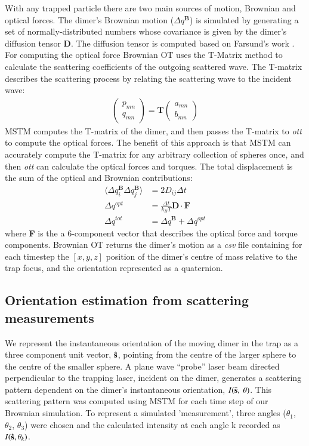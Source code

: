 \documentclass[final, 3p]{elsarticle}
\begin{document}
With any trapped particle there are two main sources of motion,
Brownian and optical forces.  The dimer's Brownian motion
($\Delta q^{\textbf{B}}$) is simulated by generating a set of
normally-distributed numbers whose covariance is given by the dimer's
diffusion tensor $\textbf{D}$.  The diffusion tensor is computed based
on Farsund's work \cite{Farsund1996}. For computing the optical force
Brownian OT uses the T-Matrix method to calculate the scattering
coefficients of the outgoing scattered wave.  The T-matrix describes
the scattering process by relating the scattering wave to the incident
wave:
\begin{align}
	\begin{pmatrix}
		p_{mn} \\
		q_{mn}
	\end{pmatrix}
	= \textbf{T}
	\begin{pmatrix}
		a_{mn} \\
		b_{mn}
	\end{pmatrix}
\end{align}
MSTM computes the T-matrix of the dimer, and then passes the T-matrix
to \textit{ott} to compute the optical forces. The benefit of this
approach is that MSTM can accurately compute the T-matrix for any
arbitrary collection of spheres once, and then \textit{ott} can
calculate the optical forces and torques. The total displacement is
the sum of the optical and Brownian contributions:
\begin{align}
  \langle \Delta q_i^{\textbf{B}} \Delta q_j^{\textbf{B}}\rangle
  &= 2D_{ij} \Delta t
  \\
  \Delta q^{opt} &= \frac{\Delta t}{k_BT}\textbf{D} \cdot \textbf{F}
  \\
\Delta q^{tot} &= \Delta q^{\textbf{B}} + \Delta q^{opt}
\end{align}
where \textbf{F} is the a 6-component vector that describes the
optical force and torque components.  Brownian OT returns the dimer's
motion as a \textit{csv} file containing for each timestep the
$[x,y,z]$ position of the dimer's centre of mass relative to the trap
focus, and the orientation represented as a quaternion.


\subsection{Orientation estimation from scattering measurements}
\label{sec:2.2}

We represent the instantaneous orientation of the moving dimer in the
trap as a three component unit vector, $\hat{\bf s}$, pointing from
the centre of the larger sphere to the centre of the smaller sphere.
A plane wave ``probe'' laser beam directed perpendicular to the
trapping laser, incident on the dimer, generates a scattering pattern
dependent on the dimer's instantaneous orientation,
$I(\bar{\bf s},\ \theta)$. This scattering pattern was computed using MSTM
for each time step of our Brownian simulation.  To represent a
simulated 'measurement', three angles ($\theta_1$, $\theta_2$,
$\theta_3$) were chosen and the calculated intensity at each angle k
recorded as $I(\hat{\bf s}, \theta_k)$.
\end{document}
